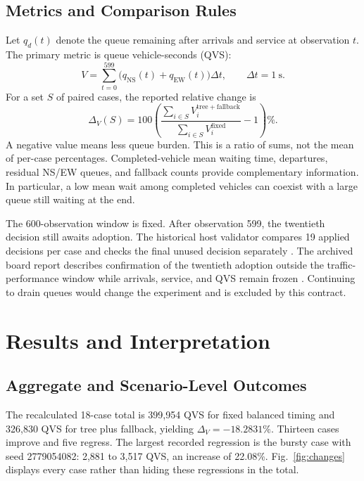 \documentclass[conference]{IEEEtran}
\begin{document}
\subsection{Metrics and Comparison Rules}
Let $q_d(t)$ denote the queue remaining after arrivals and service at observation $t$. The primary metric is queue vehicle-seconds (QVS):
\begin{equation}
 V=\sum_{t=0}^{599}\big(q_{\mathrm{NS}}(t)+q_{\mathrm{EW}}(t)\big)\Delta t,
 \qquad \Delta t=1\ \mathrm{s}.
\end{equation}
For a set $S$ of paired cases, the reported relative change is
\begin{equation}
 \Delta_V(S)=100\left(\frac{\sum_{i\in S}V_i^{\mathrm{tree+fallback}}}
 {\sum_{i\in S}V_i^{\mathrm{fixed}}}-1\right)\%.
\end{equation}
A negative value means less queue burden. This is a ratio of sums, not the mean of per-case percentages. Completed-vehicle mean waiting time, departures, residual NS/EW queues, and fallback counts provide complementary information. In particular, a low mean wait among completed vehicles can coexist with a large queue still waiting at the end.

The 600-observation window is fixed. After observation 599, the twentieth decision still awaits adoption. The historical host validator compares 19 applied decisions per case and checks the final unused decision separately \cite{projecthost}. The archived board report describes confirmation of the twentieth adoption outside the traffic-performance window while arrivals, service, and QVS remain frozen \cite{projectreport}. Continuing to drain queues would change the experiment and is excluded by this contract.

\section{Results and Interpretation}
\subsection{Aggregate and Scenario-Level Outcomes}
The recalculated 18-case total is 399,954 QVS for fixed balanced timing and 326,830 QVS for tree plus fallback, yielding $\Delta_V=-18.2831\%$. Thirteen cases improve and five regress. The largest recorded regression is the bursty case with seed 2779054082: 2,881 to 3,517 QVS, an increase of 22.08\%. Fig.~\ref{fig:changes} displays every case rather than hiding these regressions in the total.
\end{document}
